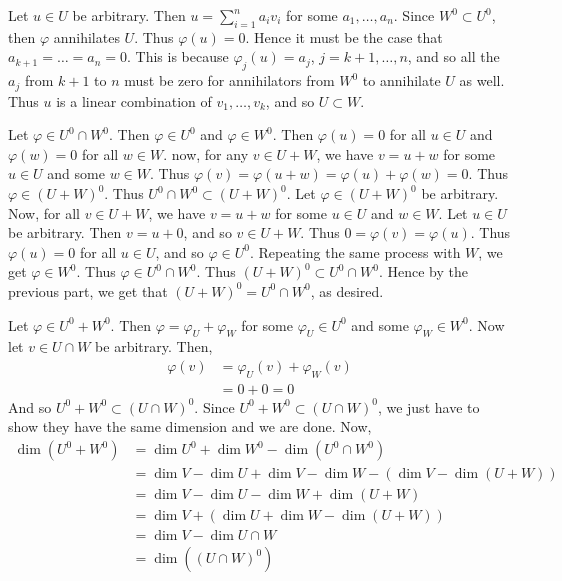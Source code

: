 \documentclass{book}
\begin{document}
\begin{enumerate}[label=\arabic*)]
      Let $u \in U$ be arbitrary. Then $u = \sum_{i = 1}^{n}a_iv_i$ for some $a_1, \dots, a_n$. Since $W^0 \subset U^0$, then $\varphi$ annihilates $U$. Thus $\varphi(u) = 0$.  Hence it must
      be the case that $a_{k + 1} = \dots = a_n = 0$. This is because $\varphi_j(u) = a_{j}$, $j = k + 1, \dots, n$, and so all the $a_j$ from $k + 1$ to $n$ must be zero for annihilators
      from $W^0$ to annihilate $U$ as well. Thus $u$ is a linear combination of $v_1, \dots, v_k$, and so $U \subset W$.
    \ii
      \begin{enumerate}[label=\alph*)]
        \ii 
          Let $\varphi \in U^0 \cap W^0$. Then $\varphi \in U^0$ and $\varphi \in W^0$. Then $\varphi(u) = 0$ for all $u \in U$ and $\varphi(w) = 0$ for all $w \in W$. now, for any $v \in U +
          W$, we have $v = u + w$ for some $u \in U$ and some $w \in W$. Thus $\varphi(v) = \varphi(u + w) = \varphi(u) + \varphi(w) = 0$. Thus $\varphi \in (U + W)^0$. Thus $U^0 \cap W^0
          \subset (U + W)^0$.
        \ii 
          Let $\varphi \in (U + W)^0$ be arbitrary. Now, for all $v \in U + W$, we have $v = u + w$ for some $u \in U$ and $w \in W$. Let $u \in U$ be arbitrary. Then $v = u + 0$, and so $v
          \in U + W$.  Thus $0 = \varphi(v) = \varphi(u)$. Thus $\varphi(u) = 0$ for all $u \in U$, and so $\varphi \in U^0$. Repeating the same process with $W$, we get $\varphi \in W^0$.
          Thus $\varphi \in U^0 \cap W^0$. Thus $(U + W)^0 \subset U^0 \cap W^0$. Hence by the previous part, we get that $(U + W)^0 = U^0 \cap W^0$, as desired.
      \end{enumerate}
    \ii
      \begin{enumerate}[label=\alph*)]
        \ii 
          Let $\varphi \in U^0 + W^0$. Then $\varphi = \varphi_U + \varphi_W$ for some $\varphi_U \in U^0$ and some $\varphi_W \in W^0$. Now let $v \in U \cap W$ be arbitrary. Then,
          \begin{align*}
            \varphi(v) & = \varphi_U(v) + \varphi_W(v) \\
            & = 0 + 0 = 0
          \end{align*}
          And so $U^0 + W^0 \subset (U \cap W)^0$.
        \ii 
          Since $U^0 + W^0 \subset (U \cap W)^0$, we just have to show they have the same dimension and we are done. Now,
          \begin{align*}
            \dim{(U^0 + W^0)} & = \dim{U^0} + \dim{W^0} - \dim{(U^0 \cap W^0)} \\
            & = \dim{V} - \dim{U} + \dim{V} - \dim{W} - \left( \dim{V} - \dim{(U + W)} \right) \\
            & = \dim{V} - \dim{U} - \dim{W} + \dim{(U + W)} \\
            & = \dim{V} + (\dim{U} + \dim{W} - \dim{(U + W)}) \\
            & = \dim{V} - \dim{U \cap W} \\
            & = \dim{\left( (U \cap W)^0 \right)}
          \end{align*}
          

\end{enumerate}
\end{enumerate}
\end{document}
